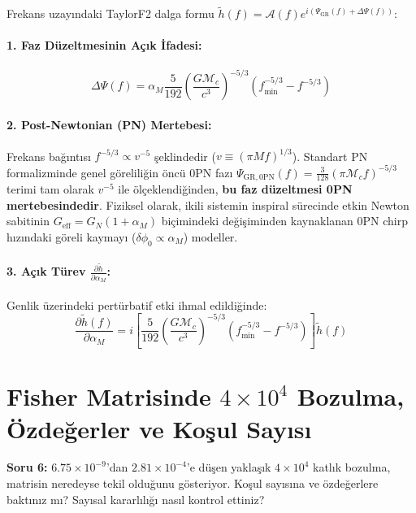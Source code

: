 \documentclass[11pt,a4paper]{article}
\begin{document}
Frekans uzayındaki TaylorF2 dalga formu $\tilde{h}(f) = \mathcal{A}(f) e^{i ( \Psi_{\text{GR}}(f) + \Delta\Psi(f) )}$:

\paragraph{1. Faz Düzeltmesinin Açık İfadesi:}
\begin{equation}
\Delta\Psi(f) = \alpha_M \frac{5}{192} \left(\frac{G\mathcal{M}_c}{c^3}\right)^{-5/3} \left( f_{\min}^{-5/3} - f^{-5/3} \right)
\end{equation}

\paragraph{2. Post-Newtonian (PN) Mertebesi:}
Frekans bağıntısı $f^{-5/3} \propto v^{-5}$ şeklindedir ($v \equiv (\pi M f)^{1/3}$). Standart PN formalizminde genel göreliliğin öncü 0PN fazı $\Psi_{\text{GR},0\text{PN}}(f) = \frac{3}{128} (\pi \mathcal{M}_c f)^{-5/3}$ terimi tam olarak $v^{-5}$ ile ölçeklendiğinden, \textbf{bu faz düzeltmesi 0PN mertebesindedir}. Fiziksel olarak, ikili sistemin inspiral sürecinde etkin Newton sabitinin $G_{\text{eff}} = G_N(1 + \alpha_M)$ biçimindeki değişiminden kaynaklanan 0PN chirp hızındaki göreli kaymayı ($\delta\phi_0 \propto \alpha_M$) modeller.

\paragraph{3. Açık Türev $\frac{\partial\tilde{h}}{\partial\alpha_M}$:}
Genlik üzerindeki pertürbatif etki ihmal edildiğinde:
\begin{equation}
\frac{\partial\tilde{h}(f)}{\partial\alpha_M} = i \left[ \frac{5}{192} \left(\frac{G\mathcal{M}_c}{c^3}\right)^{-5/3} \left( f_{\min}^{-5/3} - f^{-5/3} \right) \right] \tilde{h}(f)
\end{equation}

\section{Fisher Matrisinde $4\times 10^4$ Bozulma, Özdeğerler ve Koşul Sayısı}

\begin{questionbox}
\textbf{Soru 6:} $6.75\times 10^{-9}$’dan $2.81\times 10^{-4}$’e düşen yaklaşık $4\times 10^4$ katlık bozulma, matrisin neredeyse tekil olduğunu gösteriyor. Koşul sayısına ve özdeğerlere baktınız mı? Sayısal kararlılığı nasıl kontrol ettiniz?
\end{questionbox}
\end{document}
